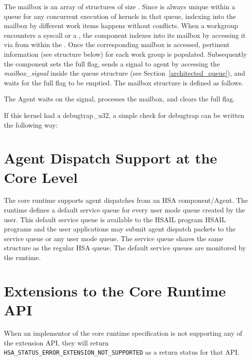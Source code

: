 The mailbox is an array of structures of size
. Since
 is always unique within a queue for any
concurrent execution of kernels in that queue, indexing into the
mailbox by different work items happens without conflicts. When a
workgroup encounters a syscall or a , the
component indexes into its mailbox by accessing it via
 from within the . Once the
corresponding mailbox is accessed, pertinent information (see
structure below) for each work group is populated.  Subsequently the
component sets the full flag, sends a signal to agent by accessing the
{\itshape mailbox\_signal} inside the queue structure (see
Section~\ref{architected_queue}), and waits for the full flag to be
emptied. The mailbox structure is defined as follows.



The Agent waits on the signal, processes the mailbox, and clears
the full flag.

If this kernel had a debugtrap\-\_\-u32, a simple check for
debugtrap can be written the following way\-:

\begin{framed}

\end{framed}

\hypertarget{coreapi_agent}{}\section{Agent Dispatch Support at the
Core Level}\label{coreapi_agent} The core runtime supports agent
dispatches from an HSA component/Agent. The runtime defines a
default service queue for every user mode queue created by the user.
This default service queue is available to the HSAIL program HSAIL
programs and the user applications may submit agent dispatch packets
to the service queue or any user mode queue.  The service queue
shares the same structure as the regular HSA queue.  The default
service queues are monitored by the runtime.




\hypertarget{extensions}{}\section{Extensions to the
Core Runtime API}\label{extensions}

When an implementor of the core runtime specification is not
supporting any of the extension API, they will return
\texttt{HSA\_STATUS\_ERROR\_EXTENSION\_NOT\_SUPPORTED} as a return
status for that API.

